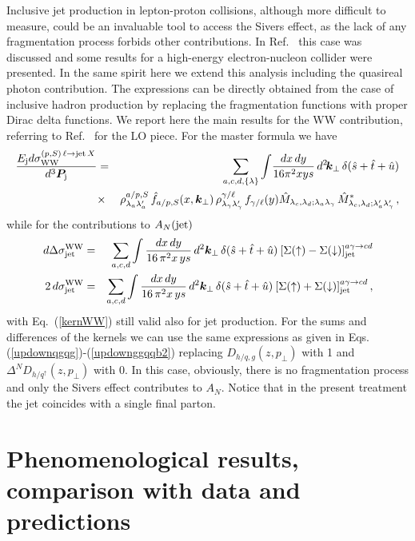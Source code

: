 \documentclass[nofootinbib,superscriptaddress,aps]{revtex4}
\newcommand{\bea}{\begin{eqnarray}}
\newcommand{\eea}{\end{eqnarray}}
\begin{document}
Inclusive jet production in lepton-proton collisions, although more difficult to measure, could be an invaluable tool to access the Sivers effect, as the lack of any fragmentation process forbids other contributions. In Ref.~\cite{Anselmino:2009pn} this case was discussed and some results for a high-energy electron-nucleon collider were presented. In the same spirit here we extend this analysis including the quasireal photon contribution. The expressions can be directly obtained from the case of inclusive hadron production by replacing the fragmentation functions with proper Dirac delta functions. We report here the main results for the WW contribution, referring to Ref.~\cite{Anselmino:2009pn} for the LO piece. For the master formula we have
%
\bea
\label{master-jet}
    \frac{E_{\rm j} d\sigma^{(p,S)\,\ell\to {\rm jet}\, X}_{\rm WW}}{d^3\bm{P}_{\rm j}}
	    & = & \sum_{a,c,d,\{\lambda\}}\int\!\frac{dx\, dy}{16\pi^2 x y s} \,d^2\!\bm{k}_\perp\,\delta(\hat s +\hat t+ \hat u)  \nonumber\\
& \times &  \rho_{\lambda _a\lambda_{a}'}^{a/p,S}\, \hat f_{a/p,S}(x,\bm{k}_{\perp})\,\rho_{\lambda _\gamma\lambda_{\gamma}'}^{\gamma/\ell}\, f_{\gamma/\ell}(y)
\hat M_{\lambda_c,\lambda_d;\lambda_a\lambda_\gamma}\,\hat M_{\lambda_c,\lambda_d;\lambda_a'\lambda_\gamma'}^*\,,
\eea
while for the contributions to $A_N(\rm jet)$
%
\bea
\label{sigmaWW-jet}
d\Delta\sigma^{\rm WW}_{\rm jet} &=& {\displaystyle \sum_{a,c,d} \int \frac{dx \,dy}{16\,\pi^2 x\,y s}}\,
d^2 \bm{k}_{\perp} \, \delta(\hat s + \hat t + \hat u)
\> [\Sigma(\uparrow) - \Sigma(\downarrow)]^{a\gamma\to cd}_{\rm jet}\\
2\,d\sigma^{\rm WW}_{\rm jet} &=& {\displaystyle \sum_{a,c,d} \int \frac{dx \,dy}{16\,\pi^2 x\,y s}}\,
d^2 \bm{k}_{\perp} \,
 \delta(\hat s + \hat t + \hat u)
\> [\Sigma(\uparrow) + \Sigma(\downarrow)]^{a\gamma\to cd}_{\rm jet}\,,
\eea
with Eq.~(\ref{kernWW}) still valid also for jet production. For the sums and differences of the kernels we can use the same expressions as given in Eqs.(\ref{updownqgqg})-(\ref{updownggqqb2}) replacing
$D_{h/q,g}(z,p_\perp)$ with 1 and $\Delta^N\!D_{h/q^\uparrow}(z,p_\perp)$ with 0. In this case, obviously, there is no fragmentation process and only the Sivers effect contributes to $A_N$. Notice that in the present treatment the jet coincides with a single final parton.



\section{Phenomenological results, comparison with data and predictions}
\label{res}
\end{document}
